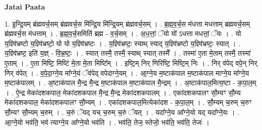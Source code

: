 \documentclass[17pt]{extarticle}
\begin{document}
\textbf{Jatai Paata} \newline

1. इ॒न्द्रि॒यम् ब्र॑ह्मवर्च॒सम् ब्र॑ह्मवर्च॒स मि॑न्द्रि॒य मि॑न्द्रि॒यम् ब्र॑ह्मवर्च॒सम् । . ब्र॒ह्म॒व॒र्च॒स म॑धत्ता मधत्ताम् ब्रह्मवर्च॒सम् ब्र॑ह्मवर्च॒स म॑धत्ताम् । . ब्र॒ह्म॒व॒र्च॒समिति॑ ब्रह्म - व॒र्च॒सम् । . अ॒ध॒त्तां॒ ॅयो यो॑ ऽधत्ता मधत्तां॒ ॅयः । . यो य॒ज्ञ्वि॑भ्रष्टो य॒ज्ञ्वि॑भ्रष्टो॒ यो यो य॒ज्ञ्वि॑भ्रष्टः । . य॒ज्ञ्वि॑भ्रष्टः॒ स्याथ् स्याद् य॒ज्ञ्वि॑भ्रष्टो य॒ज्ञ्वि॑भ्रष्टः॒ स्यात् । . य॒ज्ञ्वि॑भ्रष्ट॒ इति॑ य॒ज्ञ् - वि॒भ्र॒ष्टः॒ । . स्यात् तस्मै॒ तस्मै॒ स्याथ् स्यात् तस्मै᳚ । . तस्मा॑ ए॒ता मे॒ताम् तस्मै॒ तस्मा॑ ए॒ताम् । . ए॒ता मिष्टि॒ मिष्टि॑ मे॒ता मे॒ता मिष्टि᳚म् । . इष्टि॒म् निर् णिरिष्टि॒ मिष्टि॒म् निः । . निर् व॑पेद् वपे॒न् निर् णिर् व॑पेत् । . व॒पे॒दा॒ग्ने॒य मा᳚ग्ने॒यं ॅव॑पेद् वपेदाग्ने॒यम् । . आ॒ग्ने॒य म॒ष्टाक॑पाल म॒ष्टाक॑पाल माग्ने॒य मा᳚ग्ने॒य म॒ष्टाक॑पालम् । . अ॒ष्टाक॑पाल मै॒न्द्र मै॒न्द्र म॒ष्टाक॑पाल म॒ष्टाक॑पाल मै॒न्द्रम् । . अ॒ष्टाक॑पाल॒मित्य॒ष्टा - क॒पा॒ल॒म् । . ऐ॒न्द्र मेका॑दशकपाल॒ मेका॑दशकपाल मै॒न्द्र मै॒न्द्र मेका॑दशकपालम् । . एका॑दशकपालꣳ सौ॒म्यꣳ सौ॒म्य मेका॑दशकपाल॒ मेका॑दशकपालꣳ सौ॒म्यम् । . एका॑दशकपाल॒मित्येका॑दश - क॒पा॒ल॒म् । . सौ॒म्यम् च॒रुम् च॒रुꣳ सौ॒म्यꣳ सौ॒म्यम् च॒रुम् । . च॒रुं ॅयद् यच् च॒रुम् च॒रुं ॅयत् । . यदा᳚ग्ने॒य आ᳚ग्ने॒यो यद् यदा᳚ग्ने॒यः । . आ॒ग्ने॒यो भव॑ति॒ भव॑ त्याग्ने॒य आ᳚ग्ने॒यो भव॑ति । . भव॑ति॒ तेज॒ स्तेजो॒ भव॑ति॒ भव॑ति॒ तेजः॑ । \newline
\end{document}
